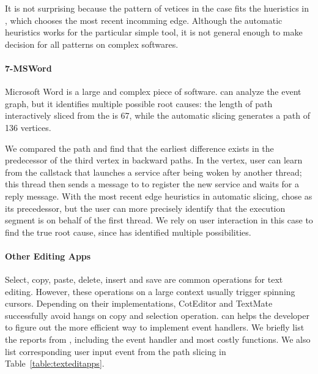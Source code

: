 It is not surprising because the pattern of vetices in the case fits the
hueristics in \xxx, which chooses the most recent incomming edge.
Although the automatic heuristics works for the particular simple tool, it is
not general enough to make decision for all patterns on complex softwares.

\paragraph{7-MSWord}

Microsoft Word is a large and complex piece of software. \xxx can analyze the
event graph, but it identifies multiple possible root causes: the length of path
interactively sliced from the \spinningnode is 67, while the automatic slicing
generates a path of 136 vertices.


We compared the path and find that the earliest difference exists in the
predecessor of the third vertex in backward paths. In the vertex, user
can learn from the callstack that  launches a service
 after being woken by another
 thread; this thread then sends a message to 
to register the new service and waits for a reply message. With the most
recent edge heuristics in automatic slicing, \xxx chose  as its
precedessor, but the user can more precisely identify that the execution segment
is on behalf of the first thread. We rely on user interaction in this case
to find the true root cause, since \xxx has identified multiple
possibilities.

\paragraph{Other Editing Apps}

Select, copy, paste, delete, insert and save are common operations for text
editing. However, these operations on a large context usually trigger spinning
cursors. Depending on their implementations, CotEditor and TextMate successfully
avoid hangs on copy and selection operation. \xxx can helps the developer to
figure out the more efficient way to implement event handlers. We briefly list
the reports from \spinningnode, including the event handler and most costly
functions. We also list corresponding user input event from the path slicing in
Table~\ref{table:texteditapps}.

